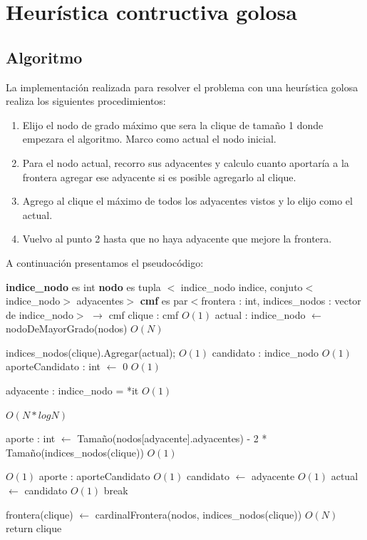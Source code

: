 \documentclass[a4paper, 10pt, twoside]{article}
\newenvironment{pseudo}[1][]{%
    \vspace{1em}%
    \begin{algorithmic}%
}
{%
    \end{algorithmic}%
    \vspace{1em}%
}
\newcommand{\Ode}[1]{\hfill $O(#1)$}
\begin{document}
\newpage

\section{Heurística contructiva golosa}
\subsection{Algoritmo}
La implementación realizada para resolver el problema con una heurística golosa realiza los siguientes procedimientos:
\begin{enumerate}
\item Elijo el nodo de grado máximo que sera la clique de tamaño 1 donde empezara el algoritmo. Marco como actual el nodo inicial.
\item Para el nodo actual, recorro sus adyacentes y calculo cuanto aportaría a la frontera agregar ese adyacente si es posible agregarlo al clique.
\item Agrego al clique el máximo de todos los adyacentes vistos y lo elijo como el actual.
\item Vuelvo al punto 2 hasta que no haya adyacente que mejore la frontera.
\end{enumerate}

A continuación presentamos el pseudocódigo:

\begin{pseudo}
\State \textbf{indice\_nodo} es int
\State \textbf{nodo} es tupla $<$ indice\_nodo indice, conjuto$<$indice\_nodo$>$ adyacentes$>$
\State \textbf{cmf} es par$<$frontera : int, indices\_nodos : vector de indice\_nodo$>$
\State
{} $\rightarrow$ cmf
	\State clique : cmf														\Ode{1}
	\State actual : indice\_nodo $\leftarrow$ nodoDeMayorGrado(nodos)		\Ode{N}

	 	\State indices\_nodos(clique).Agregar(actual);						\Ode{1}
	 	\State candidato : indice\_nodo										\Ode{1}
		\State aporteCandidato : int $\leftarrow$ 0							\Ode{1}


	 		\State adyacente : indice\_nodo = *it							\Ode{1}
	 		
	 					\Ode{N*log N}

	 			\State aporte : int $\leftarrow$ Tamaño(nodos[adyacente].adyacentes) -
	 					     2 * Tamaño(indices\_nodos(clique))				\Ode{1}

	 											\Ode{1}
	 				\State aporte : aporteCandidato							\Ode{1}
	 				\State candidato $\leftarrow$ adyacente					\Ode{1}
	 			\EndIf
	 		\EndIf
	 	\EndFor
	 	 actual $\leftarrow$ candidato			\Ode{1}
	 	\Else
	 		\State break
	 	\EndIf
	\EndWhile

	\State frontera(clique) $\leftarrow$ cardinalFrontera(nodos, indices\_nodos(clique)) \Ode{N}
	\State return clique
\EndProcedure
\end{pseudo}
\end{document}

